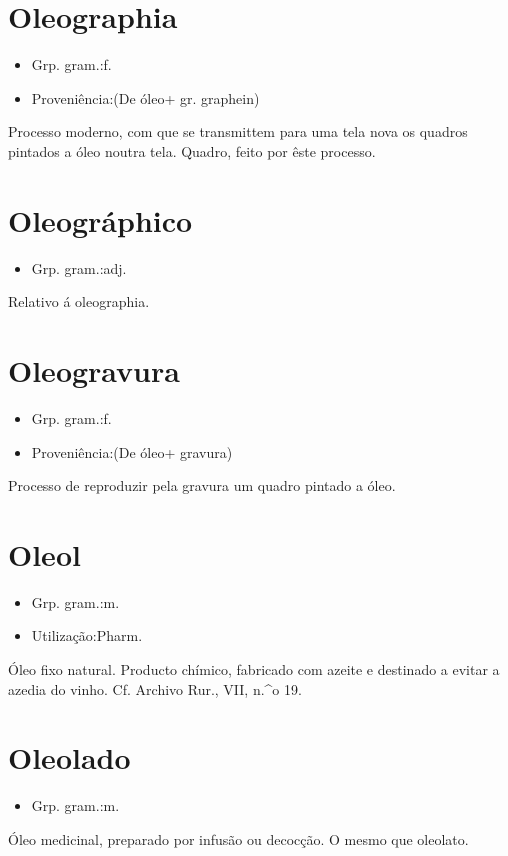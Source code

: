 \section{Oleographia}
\begin{itemize}
\item {Grp. gram.:f.}
\end{itemize}
\begin{itemize}
\item {Proveniência:(De \textunderscore óleo\textunderscore  + gr. \textunderscore graphein\textunderscore )}
\end{itemize}
Processo moderno, com que se transmittem para uma tela nova os quadros pintados a óleo noutra tela.
Quadro, feito por êste processo.
\section{Oleográphico}
\begin{itemize}
\item {Grp. gram.:adj.}
\end{itemize}
Relativo á oleographia.
\section{Oleogravura}
\begin{itemize}
\item {Grp. gram.:f.}
\end{itemize}
\begin{itemize}
\item {Proveniência:(De \textunderscore óleo\textunderscore  + \textunderscore gravura\textunderscore )}
\end{itemize}
Processo de reproduzir pela gravura um quadro pintado a óleo.
\section{Oleol}
\begin{itemize}
\item {Grp. gram.:m.}
\end{itemize}
\begin{itemize}
\item {Utilização:Pharm.}
\end{itemize}
Óleo fixo natural.
Producto chímico, fabricado com azeite e destinado a evitar a azedia do vinho. Cf. \textunderscore Archivo Rur.\textunderscore , VII, n.^o 19.
\section{Oleolado}
\begin{itemize}
\item {Grp. gram.:m.}
\end{itemize}
Óleo medicinal, preparado por infusão ou decocção.
O mesmo que \textunderscore oleolato\textunderscore .
